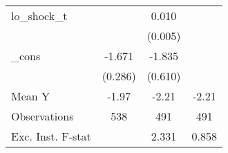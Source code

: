 {\begin{tabular}{l*{3}{c}}
\addlinespace
lo\_shock\_t  &                     &       0.010\sym{*}  &                     \\
            &                     &     (0.005)         &                     \\
\addlinespace
\_cons      &      -1.671\sym{***}&      -1.835\sym{***}&                     \\
            &     (0.286)         &     (0.610)         &                     \\
\midrule
Mean Y      &       -1.97         &       -2.21         &       -2.21         \\
Observations&         538         &         491         &         491         \\
Exc. Inst. F-stat&                     &       2.331         &       0.858         \\
\bottomrule
\end{tabular}
}
